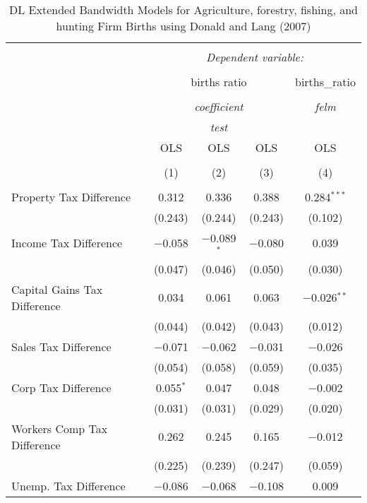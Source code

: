 
\begin{table}[!htbp] \centering 
  \caption{DL Extended Bandwidth Models for  Agriculture, forestry, fishing, and hunting Firm Births using Donald and Lang (2007)} 
  \label{} 
\begin{tabular}{@{\extracolsep{5pt}}lcccc} 
\\[-1.8ex]\hline 
\hline \\[-1.8ex] 
 & \multicolumn{4}{c}{\textit{Dependent variable:}} \\ 
\cline{2-5} 
\\[-1.8ex] & \multicolumn{3}{c}{births ratio} & births\_ratio \\ 
\\[-1.8ex] & \multicolumn{3}{c}{\textit{coefficient}} & \textit{felm} \\ 
 & \multicolumn{3}{c}{\textit{test}} & \textit{} \\ 
 & OLS & OLS & OLS & OLS \\ 
\\[-1.8ex] & (1) & (2) & (3) & (4)\\ 
\hline \\[-1.8ex] 
 Property Tax Difference & 0.312 & 0.336 & 0.388 & 0.284$^{***}$ \\ 
  & (0.243) & (0.244) & (0.243) & (0.102) \\ 
  Income Tax Difference & $-$0.058 & $-$0.089$^{*}$ & $-$0.080 & 0.039 \\ 
  & (0.047) & (0.046) & (0.050) & (0.030) \\ 
  Capital Gains Tax Difference & 0.034 & 0.061 & 0.063 & $-$0.026$^{**}$ \\ 
  & (0.044) & (0.042) & (0.043) & (0.012) \\ 
  Sales Tax Difference & $-$0.071 & $-$0.062 & $-$0.031 & $-$0.026 \\ 
  & (0.054) & (0.058) & (0.059) & (0.035) \\ 
  Corp Tax Difference & 0.055$^{*}$ & 0.047 & 0.048 & $-$0.002 \\ 
  & (0.031) & (0.031) & (0.029) & (0.020) \\ 
  Workers Comp Tax Difference & 0.262 & 0.245 & 0.165 & $-$0.012 \\ 
  & (0.225) & (0.239) & (0.247) & (0.059) \\ 
  Unemp. Tax Difference & $-$0.086 & $-$0.068 & $-$0.108 & 0.009 \\ 

\end{tabular}
\end{table}
